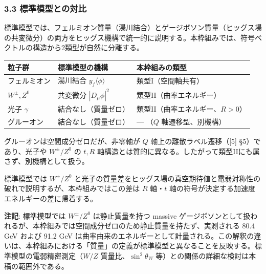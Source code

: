\documentclass[
  a4paper,11pt]{ltjsarticle}
\newcounter{none}
\theoremstyle{definition}
\theoremstyle{remark}
\begin{document}
\subsubsection{3.3
標準模型との対比}\label{ux6a19ux6e96ux6a21ux578bux3068ux306eux5bfeux6bd4}

標準模型では、フェルミオン質量（湯川結合）とゲージボソン質量（ヒッグス場の共変微分）の両方をヒッグス機構で統一的に説明する。本枠組みでは、符号ベクトルの構造から2類型が自然に分離する。

{\def\LTcaptype{none} %
\begin{longtable}[]{@{}
  >{\raggedright\arraybackslash}p{}
  >{\raggedright\arraybackslash}p{}
  >{\raggedright\arraybackslash}p{}@{}}
\toprule\noalign{}
\begin{minipage}[b]{\linewidth}\raggedright
粒子群
\end{minipage} & \begin{minipage}[b]{\linewidth}\raggedright
標準模型の機構
\end{minipage} & \begin{minipage}[b]{\linewidth}\raggedright
本枠組みの類型
\end{minipage} \\
\midrule\noalign{}
\endhead
\bottomrule\noalign{}
\endlastfoot
フェルミオン & 湯川結合 \(y_f \langle\phi\rangle\) &
類型I（空間軸共有） \\
\(W^{\pm}, Z^0\) & 共変微分 \(|D_\mu\phi|^2\) &
類型II（曲率エネルギー） \\
光子 \(\gamma\) & 結合なし（質量ゼロ） &
類型II（曲率エネルギー、\(R > 0\)） \\
グルーオン & 結合なし（質量ゼロ） & --- （\(Q\) 軸遷移型、別機構） \\
\end{longtable}
}

グルーオンは空間成分ゼロだが、非零軸が \(Q\)
軸上の離散ラベル遷移（{[}5{]} §5）であり、光子や \(W^{\pm}/Z^0\) の
\(t, R\)
軸構造とは質的に異なる。したがって類型IIにも属さず、別機構として扱う。

標準模型では \(W^{\pm}/Z^0\)
と光子の質量差をヒッグス場の真空期待値と電弱対称性の破れで説明するが、本枠組みではこの差は
\(R\) 軸・\(t\) 軸の符号が決定する加速度エネルギーの差に帰着する。

\textbf{注記}: 標準模型では \(W^{\pm}/Z^0\) は静止質量を持つ massive
ゲージボソンとして扱われるが、本枠組みでは空間成分ゼロのため静止質量を持たず、実測される
80.4 GeV および 91.2 GeV
は曲率由来のエネルギーとして計量される。この解釈の違いは、本枠組みにおける「質量」の定義が標準模型と異なることを反映する。標準模型の電弱精密測定（\(W/Z\)
質量比、\(\sin^2\theta_W\)
等）との関係の詳細な検討は本稿の範囲外である。
\end{document}
